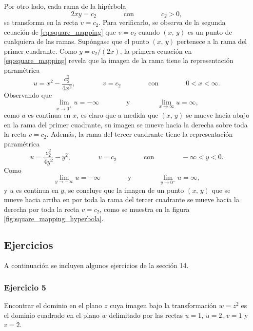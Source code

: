 \documentclass[a4paper]{report}
\begin{document}
Por otro lado, cada rama de la hipérbola 
\[
 2xy=c_2\qquad\qquad\textrm{con}\qquad\qquad c_2>0,
\]
se transforma en la recta \(v=c_2\). Para verificarlo, se observa de la segunda ecuación de \ref{eq:square_mapping} que \(v=c_2\) cuando \((x,\,y)\) es un punto de cualquiera de las ramas. Supóngase que el punto \((x,\,y)\) pertenece a la rama del primer cuadrante. Como \(y=c_2/(2x)\), la primera ecuación en \ref{eq:square_mapping} revela que la imagen de la rama tiene la representación paramétrica
\[
 u=x^2-\frac{c_2^2}{4x^2},\qquad\qquad v=c_2\qquad\qquad\textrm{con}\qquad\qquad0<x<\infty.
\]
Observando que 
\[
 \lim_{x\to0^+}u=-\infty
 \qquad\qquad\textrm{y}\qquad\qquad
 \lim_{x\to\infty}u=\infty,
\]
como \(u\) es continua en \(x\), es claro que a medida que \((x,\,y)\) se mueve hacia abajo en la rama del primer cuadrante, su imagen se mueve hacia la derecha sobre toda la recta \(v=c_2\). Además, la rama del tercer cuadrante tiene la representación paramétrica
\[
 u=\frac{c_2^2}{4y^2}-y^2,\qquad\qquad v=c_2\qquad\qquad\textrm{con}\qquad\qquad-\infty<y<0.
\]
Como
\[
 \lim_{y\to-\infty}u=-\infty
 \qquad\qquad\textrm{y}\qquad\qquad
 \lim_{y\to0^-}u=\infty,
\]
y \(u\) es continua en \(y\), se concluye que la imagen de un punto \((x,\,y)\) que se mueve hacia arriba en por toda la rama del tercer cuadrante se mueve hacia la derecha por toda la recta \(v=c_2\), como se muestra en la figura \ref{fig:square_mapping_hyperbola}.

\subsection*{Ejercicios}

A continuación se incluyen algunos ejercicios de la sección 14.

\subsubsection{Ejercicio 5}

Encontrar el dominio en el plano \(z\) cuya imagen bajo la transformación \(w=z^2\) es el dominio cuadrado en el plano \(w\) delimitado por las rectas \(u=1\), \(u=2\), \(v=1\) y \(v=2\).
\end{document}
